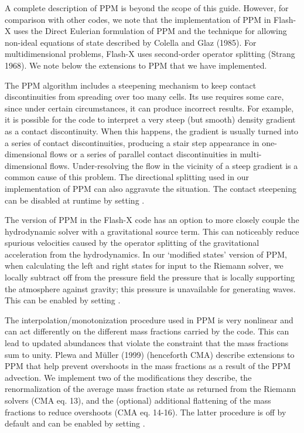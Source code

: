 A complete description of PPM is beyond the scope of this guide.
However, for comparison with other codes, we note that the
implementation of PPM in Flash-X uses the Direct Eulerian
formulation of PPM and the technique for allowing non-ideal equations
of state described by Colella and Glaz (1985). For multidimensional
problems, Flash-X uses second-order operator splitting (Strang
1968).  We note below the extensions to PPM that we have implemented.

The PPM algorithm includes a steepening mechanism to keep
contact discontinuities from spreading over too many cells.  Its use
requires some care, since under certain circumstances, it can produce
incorrect results.  For example, it is possible for the code to
interpret a very steep (but smooth) density gradient as a contact
discontinuity.  When this happens, the gradient is usually turned into
a series of contact discontinuities, producing a stair step appearance
in one-dimensional flows or a series of parallel contact
discontinuities in multi-dimensional flows.  Under-resolving the flow
in the vicinity of a steep gradient is a common cause of this
problem.  The directional splitting used in our implementation of PPM
can also aggravate the situation.  The contact steepening can be disabled
at runtime by setting  .

The version of PPM in the Flash-X code has an option to more closely
couple the hydrodynamic solver with a gravitational source term.  This
can noticeably reduce spurious velocities caused by the operator
splitting of the gravitational acceleration from the hydrodynamics.  In our
`modified states' version of PPM, when calculating the left and right
states for input to the Riemann solver, we locally subtract off from
the pressure field the pressure that is locally supporting the
atmosphere against gravity; this pressure is unavailable for generating
waves.  This can be enabled by setting  .

The interpolation/monotonization procedure used in PPM is very
nonlinear and can act differently on the different mass fractions
carried by the code.  This can lead to updated abundances that violate
the constraint that the mass fractions sum to unity.  Plewa and
M\"uller (1999) (henceforth CMA) describe extensions to PPM that help
prevent overshoots in the mass fractions as a result of the PPM
advection.  We implement two of the modifications they describe, the
renormalization of the average mass fraction state as returned from
the Riemann solvers (CMA eq. 13), and the (optional) additional
flattening of the mass fractions to reduce overshoots (CMA eq. 14-16).
The latter procedure is off by default and can be enabled by setting
 .

